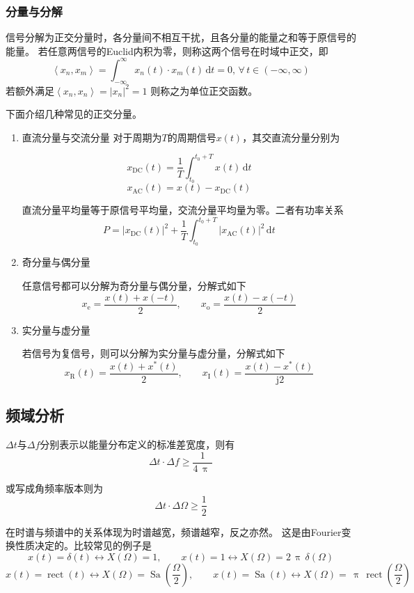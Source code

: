 \documentclass[UTF8,fontset=fandol,zihao=5]{ctexart}
\newcommand{\jj}{\,\mathrm{j}}
\newcommand{\dd}{\,\mathrm{d}}
\newcommand{\ppi}{\,\uppi\,}
\begin{document}
\subsubsection{分量与分解}

  信号分解为正交分量时，各分量间不相互干扰，且各分量的能量之和等于原信号的能量。
  若任意两信号的Euclid内积为零，则称这两个信号在时域中正交，即
  \[
  \left \langle  x_n, x_m \right \rangle  = \int_{-\infty}^{\infty} x_n(t) \cdot x_m(t) \dd t = 0, \, \forall \, t \in \left ( -\infty, \infty\right )
  \]
  若额外满足$\displaystyle \left \langle  x_n, x_n \right \rangle  = \left | x_n \right | ^2 = 1$
  则称之为单位正交函数。

  下面介绍几种常见的正交分量。

\begin{enumerate}

  \item 直流分量与交流分量
  对于周期为$T$的周期信号$x(t)$，其交直流分量分别为
  
  \[
  x_\mathrm{DC}(t) = \frac{1}{T} \int_{t_0}^{t_0+T} x(t) \dd t
  \]
  \[
  x_\mathrm{AC}(t) = x(t) - x_\mathrm{DC}(t)
  \]

  直流分量平均量等于原信号平均量，交流分量平均量为零。二者有功率关系
  \[
  P=\left | x_\mathrm{DC}(t) \right |^2 + \frac{1}{T} \int_{t_0}^{t_0+T} \left | x_\mathrm{AC}(t) \right |^2 \dd t
  \]

  \item 奇分量与偶分量
  
  任意信号都可以分解为奇分量与偶分量，分解式如下
  \[
  x_\mathrm{e} = \frac{x(t) + x(-t)}{2}
  ,\qquad
  x_\mathrm{o} = \frac{x(t) - x(-t)}{2}
  \]

  \item 实分量与虚分量
  
  若信号为复信号，则可以分解为实分量与虚分量，分解式如下
  \[
  x_\mathrm{R}(t)=\dfrac{x(t)+x^\ast(t)}{2}
  ,\qquad
  x_\mathrm{I}(t)=\dfrac{x(t)-x^\ast(t)}{\jj 2}
  \]

\end{enumerate}

\subsection{频域分析}

\begin{methodbox}[时频不确定性原理]

  $\Delta t$与$\Delta f$分别表示以能量分布定义的标准差宽度，则有
  \[
    \Delta t \cdot \Delta f \geq \frac{1}{4\ppi}
  \]

  或写成角频率版本则为
  \[
    \Delta t \cdot \Delta \varOmega \geq \frac12
  \]

  在时谱与频谱中的关系体现为时谱越宽，频谱越窄，反之亦然。
  这是由Fourier变换性质决定的。比较常见的例子是
  \[
  x(t)=\delta (t) \leftrightarrow X(\varOmega)=1, \qquad x(t)=1 \leftrightarrow X(\varOmega)=2\ppi \delta (\varOmega)
  \]
  \[
  x(t)=\operatorname{rect}(t) \leftrightarrow X(\varOmega)=\operatorname{Sa}\left (\dfrac{\varOmega}{2}\right ) , \qquad x(t)= \operatorname{Sa}(t) \leftrightarrow X(\varOmega)=\ppi \operatorname{rect}(\dfrac{\varOmega}{2})
  \]

\end{methodbox}
\end{document}
